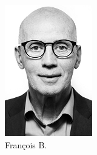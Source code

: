         \begin{figure}[h!]
            \centering
            \begin{subfigure}[b]{0.2\textwidth}
                \includegraphics[width=\textwidth]{images/francois-serieux.png}
                \caption{François B.}
                \label{fig:francois}
            \end{subfigure}
            \begin{subfigure}[b]{0.2\textwidth}

\end{subfigure}
\end{figure}
